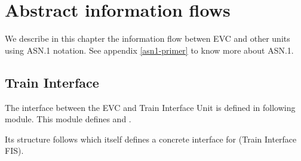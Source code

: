 \chapter{Abstract information flows}
\label{information-flows}

We describe in this chapter the information flow betwen EVC and other
units using ASN.1 notation. See appendix \ref{asn1-primer} to know
more about ASN.1.

\section{Train Interface}

The interface between the EVC and Train Interface Unit is defined in
following  module. This module defines
 and
.

Its structure follows \cite{subset-094} which itself defines a
concrete interface for \cite{subset-034} (Train Interface FIS).


